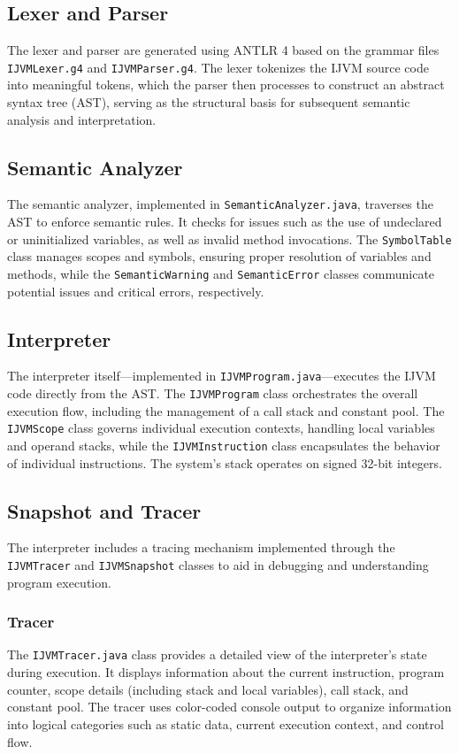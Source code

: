 \documentclass[11pt]{article}
\begin{document}
\subsection{Lexer and Parser}
The lexer and parser are generated using ANTLR 4 based on the grammar files \texttt{IJVMLexer.g4} and \texttt{IJVMParser.g4}. The lexer tokenizes the IJVM source code into meaningful tokens, which the parser then processes to construct an abstract syntax tree (AST), serving as the structural basis for subsequent semantic analysis and interpretation.

\subsection{Semantic Analyzer}
The semantic analyzer, implemented in \texttt{SemanticAnalyzer.java}, traverses the AST to enforce semantic rules. It checks for issues such as the use of undeclared or uninitialized variables, as well as invalid method invocations. The \texttt{SymbolTable} class manages scopes and symbols, ensuring proper resolution of variables and methods, while the \texttt{SemanticWarning} and \texttt{SemanticError} classes communicate potential issues and critical errors, respectively.

\subsection{Interpreter}
The interpreter itself—implemented in \texttt{IJVMProgram.java}—executes the IJVM code directly from the AST. The \texttt{IJVMProgram} class orchestrates the overall execution flow, including the management of a call stack and constant pool. The \texttt{IJVMScope} class governs individual execution contexts, handling local variables and operand stacks, while the \texttt{IJVMInstruction} class encapsulates the behavior of individual instructions. The system's stack operates on signed 32-bit integers.

\subsection{Snapshot and Tracer}
The interpreter includes a tracing mechanism implemented through the \texttt{IJVMTracer} and \texttt{IJVMSnapshot} classes to aid in debugging and understanding program execution.

\subsubsection{Tracer}
The \texttt{IJVMTracer.java} class provides a detailed view of the interpreter's state during execution. It displays information about the current instruction, program counter, scope details (including stack and local variables), call stack, and constant pool. The tracer uses color-coded console output to organize information into logical categories such as static data, current execution context, and control flow.
\end{document}
